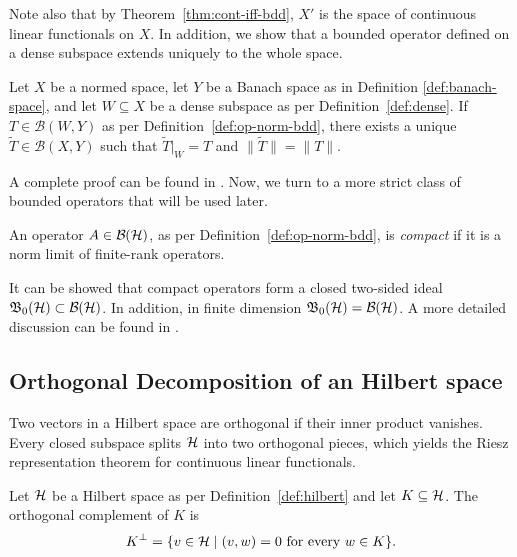 \noindent Note also that by Theorem~\ref{thm:cont-iff-bdd}, $X'$ is the space of continuous linear functionals on $X$. In addition, we show that a bounded operator defined on a dense subspace extends uniquely to the whole space.

\begin{proposition}\label{prop:blt}
	Let $X$ be a normed space, let $Y$ be a Banach space as in Definition \ref{def:banach-space}, and let $W\subseteq X$ be a dense subspace as per Definition~\ref{def:dense}. If $T\in\mathcal{B}(W,Y)$ as per Definition~\ref{def:op-norm-bdd}, there exists a unique $\widetilde T\in\mathcal{B}(X,Y)$ such that $\widetilde T|_W=T$ and $\|\widetilde T\|=\|T\|$.
\end{proposition}

A complete proof can be found in \cite[Proposition 2.47]{morettiSpectralTheoryQuantum}. 
Now, we turn to a more strict class of bounded operators that will be used later.

\begin{definition}
	\label{def:compact-operators}
	An operator $A\in\BH$, as per Definition~\ref{def:op-norm-bdd}, is
	\emph{compact} if it is a norm limit of finite-rank operators. 
\end{definition}

It can be showed that compact operators form a closed two-sided ideal $\mathfrak{B}_0(\H)\subset\BH$. In addition, in finite dimension $\mathfrak{B}_0(\H)=\BH$. A more detailed discussion can be found in \cite[Chapter 4]{morettiSpectralTheoryQuantum}.

\subsection*{Orthogonal Decomposition of an Hilbert space}

Two vectors in a Hilbert space are orthogonal if their inner product vanishes. Every closed subspace splits $\H$ into two orthogonal pieces, which yields the Riesz representation theorem for continuous linear functionals. 

\begin{definition}\label{def:orth-complement}
	Let $\H$ be a Hilbert space as per Definition~\ref{def:hilbert} and let $K\subseteq\H$. The orthogonal complement of $K$ is
	\begin{equation}
		K^{\perp}=\{v\in\H\mid( v,w)=0\text{ for every }w\in K\}.
	\end{equation}
\end{definition}

